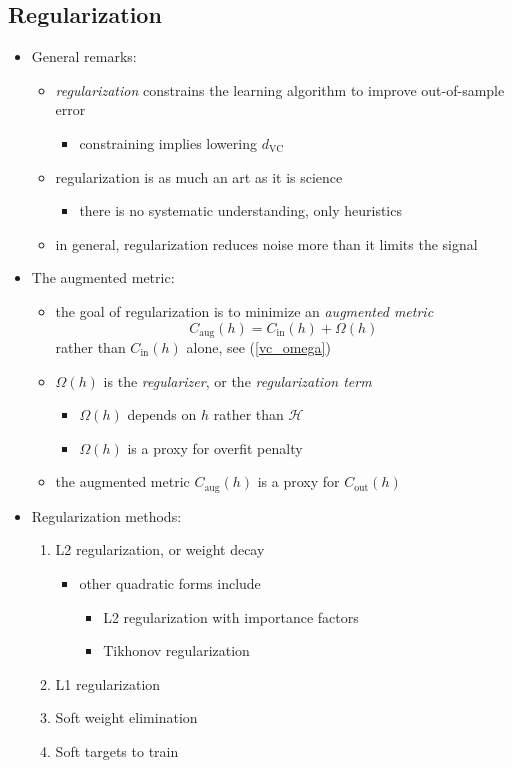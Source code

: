 \documentclass[onecolumn]{IEEEtran}
\newcommand{\beq}{\begin{equation}}
\newcommand{\eeq}{\end{equation}}
\newcommand{\bi}{\begin{itemize}}
\newcommand{\ei}{\end{itemize}}
\begin{document}
\subsection{Regularization}
\begin{itemize}

    \item General remarks:
    \bi
        \item \emph{regularization} constrains the learning algorithm to improve out-of-sample error
        \bi
            \item constraining implies lowering $d_\text{VC}$
        \ei
        \item regularization is as much an art as it is science
        \bi
            \item there is no systematic understanding, only heuristics
        \ei
        \item in general, regularization reduces noise more than it limits the signal
    \ei
    \item The augmented metric:
    \bi
        \item the goal of regularization is to minimize an \emph{augmented metric}
        \beq\label{augmented_metric}
             C_\text{aug}(h) = C_\text{in}(h) + \Omega(h)
        \eeq
        rather than $C_\text{in}(h)$ alone, see (\ref{vc_omega})
        \item $\Omega(h)$ is the \emph{regularizer}, or the \emph{regularization term}
        \bi
            \item $\Omega(h)$ depends on $h$ rather than $\mathcal{H}$
            \item $\Omega(h)$ is a proxy for overfit penalty
        \ei
        \item the augmented metric $C_\text{aug}(h)$ is a proxy for $C_\text{out}(h)$
    \ei
    \item Regularization methods:
    \begin{enumerate}
        \item L2 regularization, or weight decay
        \bi
            \item other quadratic forms include
            \bi
                \item L2 regularization with importance factors
                \item Tikhonov regularization
            \ei
        \ei
      \item L1 regularization
      \item Soft weight elimination
      \item Soft targets to train

\end{enumerate}
\end{itemize}
\end{document}
